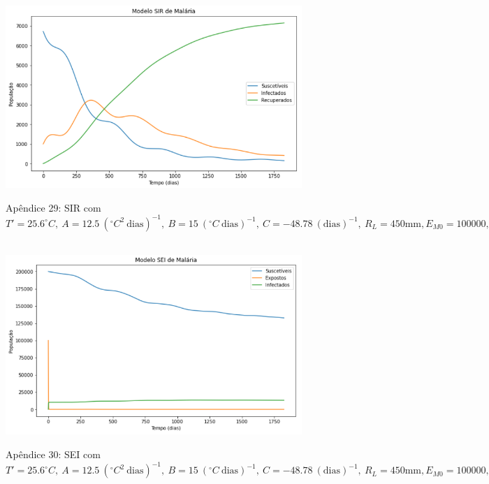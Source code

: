 \documentclass[
	12pt,				%
	oneside,			%
	a4paper,			%
	english,			%
	brazil				%
	]{abntex2}
\begin{document}
\begin{apendicesenv}
\begin{figure}[!ht]
	\centering
	\hbox{\hspace{2.7em} \includegraphics[scale=0.7] {SIR_Entrada_Pop_100000_1000_Infect.png}}
	\caption*{Apêndice 29: SIR com $T'=25.6^\circ C, \ A=12.5 \ (^\circ C^2 \ \text{dias})^{-1}, \ B=15 \ (^\circ C \ \text{dias})^{-1}, \ C=-48.78 \ (\text{dias})^{-1}, \ R_L=450 \text{mm}, E_{M0}=100000, I_{H0}=1000$} 
\end{figure} 
\begin{figure}[!ht]
	\centering
	\hbox{\hspace{2.5em} \includegraphics[scale=0.7] {SEI_Entrada_Pop_100000_1000_Infect.png}}
	\caption*{Apêndice 30: SEI com $T'=25.6^\circ C, \ A=12.5 \ (^\circ C^2 \ \text{dias})^{-1}, \ B=15 \ (^\circ C \ \text{dias})^{-1}, \ C=-48.78 \ (\text{dias})^{-1}, \ R_L=450 \text{mm}, E_{M0}=100000, I_{H0}=1000$} 
\end{figure} 

\end{apendicesenv}




\printindex
\end{document}
